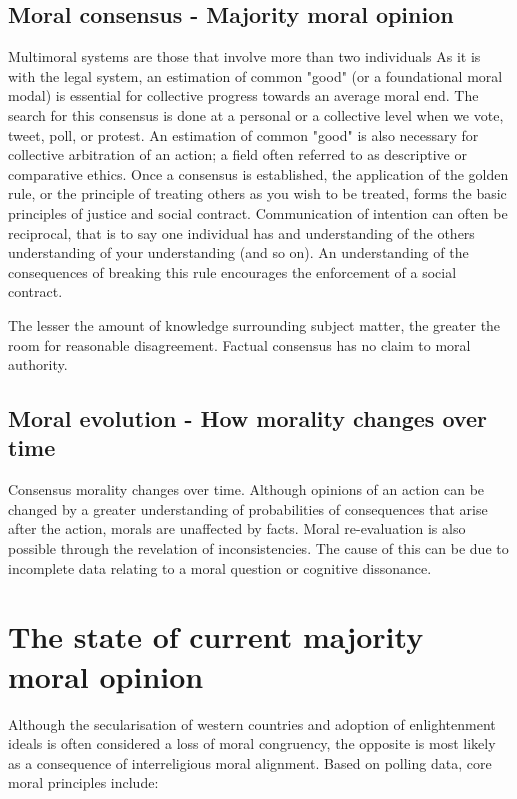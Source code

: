 \subsection{Moral consensus - Majority moral opinion}
Multimoral systems are those that involve more than two individuals
As it is with the legal system, an estimation of common "good" (or a foundational moral modal) is essential for collective progress towards an average moral end.
The search for this consensus is done at a personal or a collective level when we vote, tweet, poll, or protest. 
An estimation of common "good" is also necessary for collective arbitration of an action; a field often referred to as descriptive or comparative ethics.
Once a consensus is established, the application of the golden rule, or the principle of treating others as you wish to be treated, forms the basic principles of justice and social contract.
Communication of intention can often be reciprocal, that is to say one individual has and understanding of the others understanding of your understanding (and so on).
An understanding of the consequences of breaking this rule encourages the enforcement of a social contract.

The lesser the amount of knowledge surrounding subject matter, the greater the room for reasonable disagreement. 
Factual consensus has no claim to moral authority.

\subsection{Moral evolution - How morality changes over time}
Consensus morality changes over time.
Although opinions of an action can be changed by a greater understanding of probabilities of consequences that arise after the action, morals are unaffected by facts.
Moral re-evaluation is also possible through the revelation of inconsistencies.
The cause of this can be due to incomplete data relating to a moral question or cognitive dissonance.

\section{The state of current majority moral opinion}
Although the secularisation of western countries and adoption of enlightenment ideals is often considered a loss of moral congruency, the opposite is most likely as a consequence of interreligious moral alignment.
Based on polling data, core moral principles include:

